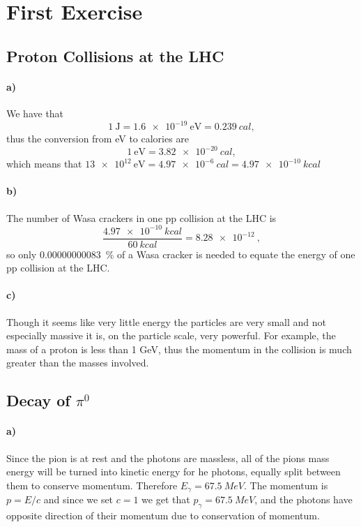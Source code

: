 \section{First Exercise}
\subsection{Proton Collisions at the LHC}
\paragraph{a)} We have that 
\begin{equation}
	\SI{1}{\joule} = \SI{1.6e-19}{\electronvolt} = \SI{0.239}{cal},
\end{equation}
thus the conversion from eV to calories are
\begin{equation}
	\SI{1}{\electronvolt} = \SI{3.82e-20}{cal},
\end{equation}
which means that $\SI{13e12}{\electronvolt} = \SI{4.97e-6}{cal} = \SI{4.97e-10}{kcal}$

\paragraph{b)} The number of Wasa crackers in one pp collision at the LHC is 
\begin{equation}
	\frac{\SI{4.97e-10}{kcal}}{\SI{60}{kcal}} = \SI{8.28e-12}{},
\end{equation}
so only \SI{0.00000000083}{\percent} of a Wasa cracker is needed to equate the energy of one pp collision at the LHC.

\paragraph{c)} Though it seems like very little energy the particles are very small and not especially massive it is, on the particle scale, very powerful. For example, the mass of a proton is less than 1 GeV, thus the momentum in the collision is much greater than the masses involved.

\subsection{Decay of \texorpdfstring{$\pi^0$}{pi}}
\paragraph{a)} Since the pion is at rest and the photons are massless, all of the pions mass energy will be turned into kinetic energy for he photons, equally split between them to conserve momentum. Therefore $E_\gamma = \SI{67.5}{MeV}$. The momentum is $p = E/c$ and since we set $c=1$ we get that $p_\gamma = \SI{67.5}{MeV}$, and the photons have opposite direction of their momentum due to conservation of momentum.

